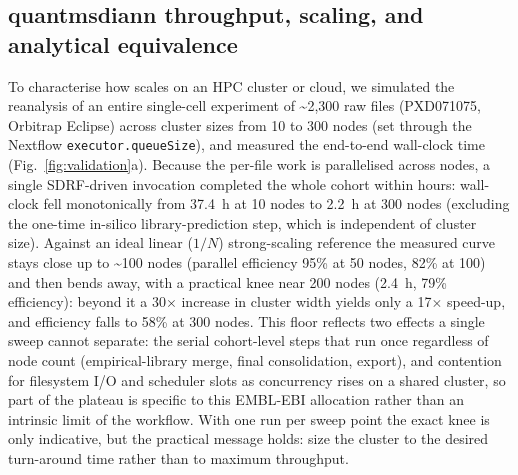 \documentclass[preprint,12pt]{elsarticle}
\begin{document}
\subsection{quantmsdiann throughput, scaling, and analytical equivalence}
\label{sec:throughput}

To characterise how \quantmsdiann{} scales on an HPC cluster or cloud, we simulated the reanalysis of an entire single-cell experiment of \textasciitilde 2{,}300 raw files (PXD071075, Orbitrap Eclipse) across cluster sizes from 10 to 300 nodes (set through the Nextflow \texttt{executor.queueSize}), and measured the end-to-end wall-clock time (Fig.~\ref{fig:validation}a). Because the per-file work is parallelised across nodes, a single SDRF-driven invocation completed the whole cohort within hours: wall-clock fell monotonically from 37.4~h at 10 nodes to 2.2~h at 300 nodes (excluding the one-time in-silico library-prediction step, which is independent of cluster size). Against an ideal linear ($1{/}N$) strong-scaling reference the measured curve stays close up to \textasciitilde 100 nodes (parallel efficiency 95\% at 50 nodes, 82\% at 100) and then bends away, with a practical knee near 200 nodes (2.4~h, 79\% efficiency): beyond it a 30$\times$ increase in cluster width yields only a 17$\times$ speed-up, and efficiency falls to 58\% at 300 nodes. This floor reflects two effects a single sweep cannot separate: the serial cohort-level steps that run once regardless of node count (empirical-library merge, final consolidation, export), and contention for filesystem I/O and scheduler slots as concurrency rises on a shared cluster, so part of the plateau is specific to this EMBL-EBI allocation rather than an intrinsic limit of the workflow. With one run per sweep point the exact knee is only indicative, but the practical message holds: size the cluster to the desired turn-around time rather than to maximum throughput.
\end{document}
